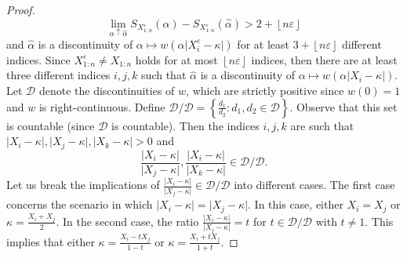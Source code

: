 \documentclass{article}
\theoremstyle{plain}
\theoremstyle{definition}
\def\sD{\mathcal{D}}\def\sE{\mathcal{E}}\def\sF{\mathcal{F}}
\begin{document}
\begin{appendix}
\begin{proof}
		\[
      \lim_{\alpha\uparrow\widehat{\alpha}}S_{X_{1:n}^{\varepsilon}}(\alpha)-S_{X_{1:n}^{\varepsilon}}(\widehat{\alpha})>2+ \left\lfloor n \varepsilon  \right\rfloor
		\]
    and $\widehat{\alpha}$ is a discontinuity of $\alpha\mapsto w(\alpha \lvert  X_i^{\varepsilon}-\kappa\rvert )$ for at least \( 3 + \left\lfloor n \varepsilon  \right\rfloor \)  different indices. Since \( X_{1:n}^\varepsilon \neq X_{1:n} \) holds for at most \( \left\lfloor n \varepsilon  \right\rfloor \) indices, then there are at least three different indices \( i,j,k \) such that \( \widehat{\alpha }  \) is a discontinuity of \( \alpha  \mapsto w(\alpha \lvert X_i - \kappa  \rvert )  \). Let \( \sD \) denote the discontinuities of \( w \), which are strictly positive since \( w(0)=1 \) and \( w \) is right-continuous. Define \( \sD / \sD = \left\{\frac{d_1}{d_2}: d_1,d_2 \in \sD \right\}\). Observe that this set is countable (since \( \sD \) is countable). Then the indices \( i,j,k \) are such that \( \lvert X_i - \kappa  \rvert, \lvert X_j - \kappa  \rvert, \lvert X_k - \kappa  \rvert >0 \) and \begin{equation}\label{eq:discontinuities}
      \frac{\lvert X_i - \kappa \rvert}{\lvert X_j - \kappa  \rvert },        \frac{\lvert X_i - \kappa \rvert}{\lvert X_k - \kappa  \rvert } \in \sD / \sD. 
    \end{equation}   
    Let us break the implications of \( \frac{\lvert   X_i-\kappa\rvert }{\lvert X_j -\kappa  \rvert } \in \sD / \sD \) into different cases. The first case concerns the scenario in which \( \lvert X_i- \kappa  \rvert = \lvert X_j -\kappa  \rvert \). In this case, either \( X_i=X_j \) or \( \kappa = \frac{X_i+X_j}{2} \). In the second case, the ratio \( \frac{\lvert X_i - \kappa  \rvert }{\lvert  X_j -\kappa  \rvert } =t \) for \( t \in  \sD / \sD \) with \( t \neq  1 \).
    This implies that either \( \kappa =\frac{X_i-tX_j}{1-t} \) or \(   \kappa =\frac{X_i+tX_j}{1+t} \). 


\end{proof}
\end{appendix}
\end{document}
